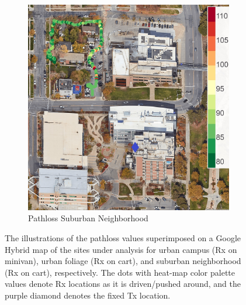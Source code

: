 \documentclass[10pt, twocolumn]{IEEEtran}
\begin{document}
\begin{figure} [t]
     \begin{subfigure}{0.245\linewidth}
         \centering
         \includegraphics[width=1.0\linewidth]{figs/pl_suburban_fraternities.jpg}
         \caption{Pathloss Suburban Neighborhood}
         \label{F5c}
     \end{subfigure}
     \vspace{-2mm}
     \caption{The illustrations of the pathloss values superimposed on a Google Hybrid map of the sites under analysis for urban campus (Rx on minivan), urban foliage (Rx on cart), and suburban neighborhood (Rx on cart), respectively. The dots with heat-map color palette values denote Rx locations as it is driven/pushed around, and the purple diamond denotes the fixed Tx location.}
     \label{F5}
     \vspace{-7mm}
\end{figure}
\end{document}
